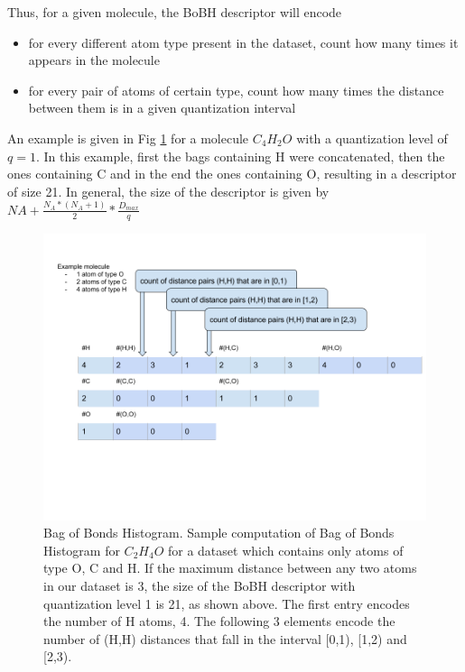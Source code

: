 \documentclass{article}
\begin{document}
Thus, for a given molecule, the BoBH descriptor will encode
\begin{itemize}
\item 
for every different atom type present in the dataset, count how many times it appears in the molecule
\item  
for every pair of atoms of certain type, count how many times the distance between them is in a given quantization interval 
\end{itemize}

An example is given in Fig \ref{fig:BoBH} for a molecule $C_{4}H_{2}O$ with a quantization level of $q=1$. In this example, first the bags containing H were concatenated, then the ones containing C and in the end the ones containing O, resulting in a descriptor of size 21. In general, the size of the descriptor is given by $NA +  \frac{N_A*(N_A+1)}{2} *\frac{D_{max}}{q} $ 

\begin{figure}[h!]

\includegraphics[scale=0.4]{HistogramOfDistances.png}
\caption{Bag of Bonds Histogram.
Sample computation of Bag of Bonds Histogram for $C_2H_4O$ for a dataset which contains only atoms of type O, C and H. If the maximum distance between any two atoms in our dataset is 3, the size of the BoBH descriptor with quantization level  1 is 21, as shown above. The first entry encodes the number of H atoms, 4. The following 3 elements encode the number of (H,H) distances that fall in the interval [0,1), [1,2) and [2,3).
}
\label{fig:BoBH}
\end{figure}
\end{document}
